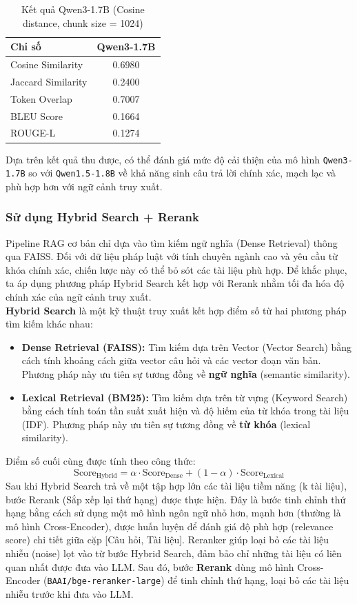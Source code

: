 \begin{table}[H]
\centering
\caption{Kết quả Qwen3-1.7B (Cosine distance, chunk size = 1024)}
\begin{tabular}{lc}
  \toprule
  \textbf{Chỉ số} & \textbf{Qwen3-1.7B} \\
  \midrule
  Cosine Similarity  & 0.6980 \\
  Jaccard Similarity & 0.2400 \\
  Token Overlap      & 0.7007 \\
  BLEU Score         & 0.1664 \\
  ROUGE-L            & 0.1274 \\
  \bottomrule
\end{tabular}
\end{table}
Dựa trên kết quả thu được, có thể đánh giá mức độ cải thiện của mô hình \texttt{Qwen3-1.7B} so với
\texttt{Qwen1.5-1.8B} về khả năng sinh câu trả lời chính xác, mạch lạc và phù hợp hơn với ngữ cảnh
truy xuất.
\subsubsection{Sử dụng Hybrid Search + Rerank}
Pipeline RAG cơ bản chỉ dựa vào tìm kiếm ngữ nghĩa (Dense Retrieval) thông qua FAISS. Đối
với dữ liệu pháp luật với tính chuyên ngành cao và yêu cầu từ khóa chính xác, chiến lược này
có thể bỏ sót các tài liệu phù hợp. Để khắc phục, ta áp dụng phương pháp Hybrid Search kết
hợp với Rerank nhằm tối đa hóa độ chính xác của ngữ cảnh truy xuất.\\

\textbf{Hybrid Search} là một kỹ thuật truy xuất kết hợp điểm số từ hai phương pháp tìm kiếm khác nhau:
\begin{itemize}
  \item \textbf{Dense Retrieval (FAISS):} Tìm kiếm dựa trên Vector (Vector Search) bằng cách tính khoảng
    cách giữa vector câu hỏi và các vector đoạn văn bản. Phương pháp này ưu tiên sự tương
    đồng về \textbf{ngữ nghĩa} (semantic similarity).
  \item \textbf{Lexical Retrieval (BM25)\cite{robertson1994bm25}:} Tìm kiếm dựa trên từ vựng (Keyword Search) bằng cách tính
    toán tần suất xuất hiện và độ hiếm của từ khóa trong tài liệu (IDF). Phương pháp này
    ưu tiên sự tương đồng về \textbf{từ khóa} (lexical similarity).
\end{itemize}

Điểm số cuối cùng được tính theo công thức:
\[
  \text{Score}_{\text{Hybrid}} = \alpha \cdot \text{Score}_{\text{Dense}} + (1 - \alpha) \cdot \text{Score}_{\text{Lexical}}
\]
Sau khi Hybrid Search trả về một tập hợp lớn các tài liệu tiềm năng (k tài
liệu), bước Rerank (Sắp xếp lại thứ hạng) được thực hiện. Đây là bước tinh chỉnh thứ hạng bằng
cách sử dụng một mô hình ngôn ngữ nhỏ hơn, mạnh hơn (thường là mô hình Cross-Encoder), được huấn luyện để đánh giá độ phù hợp (relevance score) chi tiết giữa cặp [Câu hỏi, Tài liệu].
Reranker giúp loại bỏ các tài liệu nhiễu (noise) lọt vào từ bước Hybrid Search, đảm bảo chỉ
những tài liệu có liên quan nhất được đưa vào LLM.
Sau đó, bước \textbf{Rerank} dùng mô hình Cross-Encoder (\texttt{BAAI/bge-reranker-large}) \cite{bge_reranker} để tinh chỉnh thứ hạng, loại bỏ các tài liệu nhiễu trước khi đưa vào LLM.

